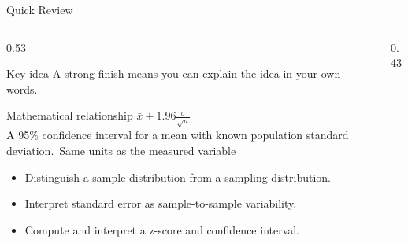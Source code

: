\documentclass[aspectratio=169]{beamer}
\begin{document}
\begin{frame}{Quick Review}
\begin{columns}[T]
\begin{column}{0.53\textwidth}
\begin{alertblock}{Key idea}
\small A strong finish means you can explain the idea in your own words.
\end{alertblock}

\begin{block}{Mathematical relationship}
\centering\Large $\bar{x}\pm1.96\frac{\sigma}{\sqrt{n}}$\\[0.12cm]
\small A 95\% confidence interval for a mean with known population standard deviation.\ Same units as the measured variable
\end{block}

\begin{itemize}
\small
\item Distinguish a sample distribution from a sampling distribution.
\item Interpret standard error as sample-to-sample variability.
\item Compute and interpret a z-score and confidence interval.
\end{itemize}
\end{column}
\begin{column}{0.43\textwidth}
\begin{center}\end{center}
\end{column}
\end{columns}

\end{frame}
\end{document}
